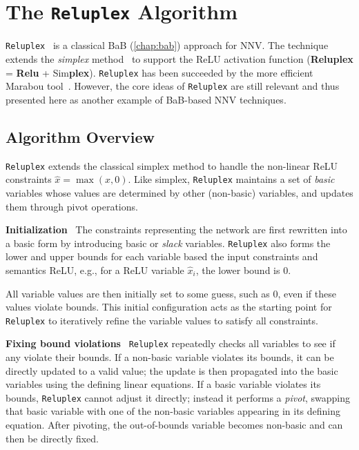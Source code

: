 \documentclass[oneside,11pt,dvipsnames]{book}
\numberwithin{equation}{section}
\theoremstyle{definition}
\theoremstyle{remark}
\newcommand{\reluplex}{\texttt{Reluplex}}
\begin{document}
\chapter{The \reluplex{} Algorithm}\label{chap:reluplex}

\reluplex{}~\cite{katz2017reluplex} is a classical BaB (\autoref{chap:bab}) approach for NNV. The technique extends the \emph{simplex} method~\cite{nelder1965simplex} to support the ReLU activation function (\textbf{Reluplex} = \textbf{Relu} + Sim\textbf{plex}). \reluplex{} has been succeeded by the more efficient Marabou tool~\cite{katz2019marabou}. However, the core ideas of \reluplex{} are still relevant and thus presented here as another example of BaB-based NNV techniques.

\section{Algorithm Overview}\label{sec:reluplex-overview}


\reluplex{} extends the classical simplex method to handle the
non-linear ReLU constraints $\hat{x} = \max(x,0)$.
Like simplex, \reluplex{} maintains a set of \emph{basic} variables whose values are determined by other (non-basic) variables, and updates them through pivot operations.

\textbf{Initialization}~ The constraints representing the network are first rewritten into a basic form by introducing basic or \emph{slack} variables.  \reluplex{} also forms the lower and upper bounds for each variable based the input constraints and semantics ReLU, e.g., for a ReLU variable $\hat{x}_i$, the lower bound is 0.

All variable values are then initially set to some guess, such as $0$, even if these values violate bounds.  This initial configuration acts as the starting point for \reluplex{} to iteratively refine the variable values to satisfy all constraints.

\textbf{Fixing bound violations}~
\reluplex{} repeatedly checks all variables to see if any violate their bounds.
If a non-basic variable violates its bounds,
it can be directly updated to a valid value; the update is then propagated into the basic variables using the defining linear equations.
If a basic variable violates its bounds,
\reluplex{} cannot adjust it directly; instead it performs a \emph{pivot}, swapping that basic variable with one of the non-basic variables appearing in its defining equation.
After pivoting, the out-of-bounds variable becomes non-basic and can then be directly fixed.
\end{document}
